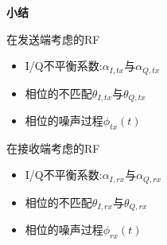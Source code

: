 	\begin{frame}{\textbf{小结}}
		\begin{block}{在发送端考虑的RF}
			\begin{itemize}
				\item I/Q不平衡系数:$\alpha_{I,tx}$与$\alpha_{Q,tx}$
				\item 相位的不匹配$\theta_{I,tx}$与$\theta_{Q,tx}$
				\item 相位的噪声过程$\phi_{tx}(t)$
			\end{itemize}
		\end{block}
	
		\begin{block}{在接收端考虑的RF}
		\begin{itemize}
			\item I/Q不平衡系数:$\alpha_{I,rx}$与$\alpha_{Q,rx}$
			\item 相位的不匹配$\theta_{I,rx}$与$\theta_{Q,rx}$
			\item 相位的噪声过程$\phi_{rx}(t)$
		\end{itemize}
		\end{block}
	\end{frame}